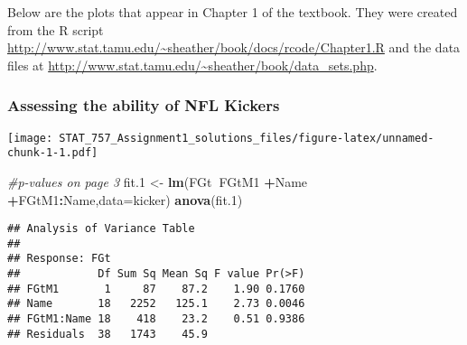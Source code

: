 \documentclass[]{article}
\newenvironment{Shaded}{\begin{snugshade}}{\end{snugshade}}
\newcommand{\CommentTok}[1]{\textcolor[rgb]{0.56,0.35,0.01}{\textit{#1}}}
\newcommand{\DataTypeTok}[1]{\textcolor[rgb]{0.13,0.29,0.53}{#1}}
\newcommand{\FloatTok}[1]{\textcolor[rgb]{0.00,0.00,0.81}{#1}}
\newcommand{\KeywordTok}[1]{\textcolor[rgb]{0.13,0.29,0.53}{\textbf{#1}}}
\newcommand{\NormalTok}[1]{#1}
\newcommand{\OperatorTok}[1]{\textcolor[rgb]{0.81,0.36,0.00}{\textbf{#1}}}
\newcommand{\StringTok}[1]{\textcolor[rgb]{0.31,0.60,0.02}{#1}}
\begin{document}
Below are the plots that appear in Chapter 1 of the textbook. They were
created from the R script
\url{http://www.stat.tamu.edu/~sheather/book/docs/rcode/Chapter1.R} and
the data files at
\url{http://www.stat.tamu.edu/~sheather/book/data_sets.php}.

\hypertarget{assessing-the-ability-of-nfl-kickers}{%
\subsubsection{Assessing the ability of NFL
Kickers}\label{assessing-the-ability-of-nfl-kickers}}

\begin{Shaded}
\end{Shaded}

\texttt{[image: STAT\_757\_Assignment1\_solutions\_files/figure-latex/unnamed-chunk-1-1.pdf]}

\begin{Shaded}
\begin{Highlighting}[]
\CommentTok{#p-values on page 3}
\NormalTok{fit}\FloatTok{.1}\NormalTok{ <-}\StringTok{ }\KeywordTok{lm}\NormalTok{(FGt}\OperatorTok{~}\NormalTok{FGtM1 }\OperatorTok{+}\NormalTok{Name }\OperatorTok{+}\NormalTok{FGtM1}\OperatorTok{:}\NormalTok{Name,}\DataTypeTok{data=}\NormalTok{kicker)}
\KeywordTok{anova}\NormalTok{(fit}\FloatTok{.1}\NormalTok{)}
\end{Highlighting}
\end{Shaded}

\begin{verbatim}
## Analysis of Variance Table
## 
## Response: FGt
##            Df Sum Sq Mean Sq F value Pr(>F)
## FGtM1       1     87    87.2    1.90 0.1760
## Name       18   2252   125.1    2.73 0.0046
## FGtM1:Name 18    418    23.2    0.51 0.9386
## Residuals  38   1743    45.9
\end{verbatim}
\end{document}
